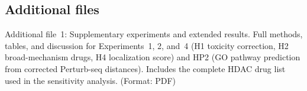 \documentclass[11pt]{article}
\begin{document}
\subsection*{Additional files}
Additional file~1: Supplementary experiments and extended results.
Full methods, tables, and discussion for Experiments~1, 2, and~4
(H1 toxicity correction, H2 broad-mechanism drugs, H4 localization
score) and HP2 (GO pathway prediction from corrected Perturb-seq
distances). Includes the complete HDAC drug list used in the
sensitivity analysis. (Format: PDF)



\end{document}
